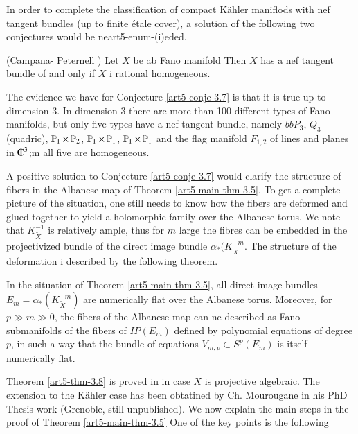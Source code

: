 In order to complete the classification of compact K\"ahler maniflods with nef tangent bundles (up to finite \'etale cover), a solution of the following two conjectures would be neart5-enum-(i)eded.

\begin{conjecture}\label{art5-conje-3.7}
(Campana- Peternell \cite{CP91}) Let $X$ be ab Fano manifold Then $X$ has a nef tangent bundle of and only if $X$ i rational homogeneous.
\end{conjecture}

The evidence we have for Conjecture \ref{art5-conje-3.7} is that it is true up to dimension 3. In dimension 3 there are more than 100 different types of Fano manifolds, but only five types have a nef tangent bundle, namely $bbP_{3}$, $Q_{3}$ (quadric), $\mathbb{P}_{1}\times \mathbb{P}_{2}$, $\mathbb{P}_{1}\times \mathbb{P}_{1}$, $\mathbb{P}_{1}\times \mathbb{P}_{1}$ and the flag manifold $F_{1,2}$ of lines and planes in $\IC^{3}$;m all five are homogeneous.   

A positive solution to Conjecture \ref{art5-conje-3.7} would clarify the structure of fibers in the Albanese map of Theorem \ref{art5-main-thm-3.5}. To get a complete picture of the situation, one still needs to know how the fibers are deformed and glued together to yield a holomorphic family over the Albanese torus. We note that $K_{\widetilde{X}}^{-1}$ is relatively ample, thus for $m$ large the fibres can be embedded in the projectivized bundle of the direct image bundle $\alpha_{*}(K_{\widetilde{X}}^{-m}$. The structure of the deformation i described by the following theorem.

\begin{theorem}\label{art5-thm-3.8}
In the situation of Theorem \ref{art5-main-thm-3.5}, all direct image bundles $E_{m}= \alpha_{*}(K_{\widetilde{X}}^{-m})$ are numerically flat over the Albanese torus. Moreover, for $p \gg m \gg 0$, the fibers of the Albanese map can ne described as Fano submanifolds of the fibers of $IP(E_{m})$ defined by polynomial equations of degree $p$, in such a way that the bundle of equations $V_{m, p} \subset S^{p}(E_{m})$ is itself numerically flat.
\end{theorem}

Theorem \ref{art5-thm-3.8} is proved in \cite{art5-keyDPS91} in case $X$ is projective algebraic. The extension to the K\"ahler case has been obtatined by Ch. Mourougane in his PhD Thesis work (Grenoble, still unpublished). We now explain the main steps in the proof of Theorem \ref{art5-main-thm-3.5} One of the key points is the following


